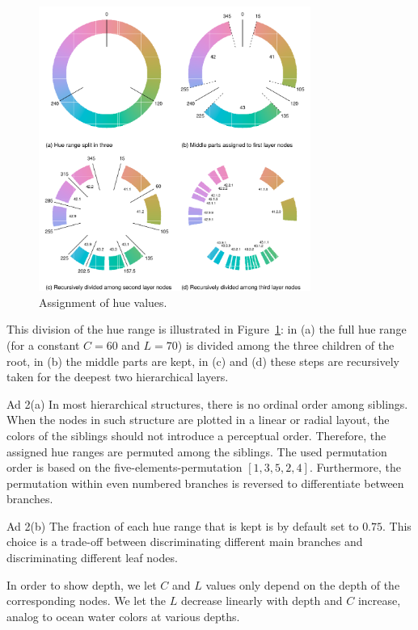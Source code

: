 \documentclass[review]{vgtc}                 %
\begin{document}
\begin{figure}[htb]
  \centering
  \includegraphics[width=3.5in]{hcl_method.pdf}
  \caption{Assignment of hue values.}\label{fig:wheel}
\end{figure}

This division of the hue range is illustrated in Figure~\ref{fig:wheel}: in (a) the full hue range (for a constant $C=60$ and $L=70$)  is divided among the three children of the root, in (b) the middle parts are kept, in (c) and (d) these steps are recursively taken for the deepest two hierarchical layers.

Ad 2(a) In most hierarchical structures, there is no ordinal order among siblings. When the nodes in such structure are plotted in a linear or radial layout, the colors of the siblings should not introduce a perceptual order. Therefore, the assigned hue ranges are permuted among the siblings. The used permutation order is based on the five-elements-permutation $[1, 3, 5, 2, 4]$. Furthermore, the permutation within even numbered branches is reversed to differentiate between branches. 

Ad 2(b) The fraction of each hue range that is kept is by default set to $0.75$. This choice is a trade-off between discriminating different main branches and discriminating different leaf nodes. 

In order to show depth, we let $C$ and $L$ values only depend on the depth of the corresponding nodes. We let the $L$ decrease linearly with depth and $C$ increase, analog to ocean water colors at various depths.
\end{document}
